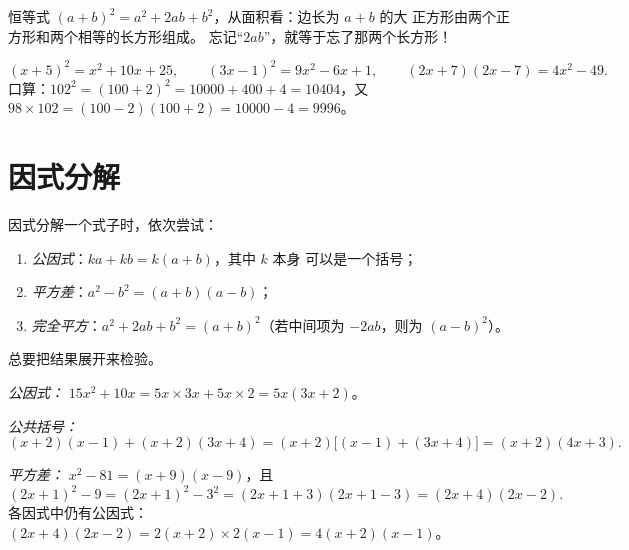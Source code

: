 \begin{omfigure}

{\small 恒等式 $(a+b)^2 = a^2 + 2ab + b^2$，从面积看：边长为 $a+b$ 的大
正方形由两个正方形和两个相等的长方形组成。
忘记“$2ab$”，就等于忘了那两个长方形！}
\end{omfigure}

\begin{example}\label{ex:g9:algebra:identities}
\[
(x + 5)^2 = x^2 + 10x + 25, \qquad
(3x - 1)^2 = 9x^2 - 6x + 1, \qquad
(2x + 7)(2x - 7) = 4x^2 - 49 .
\]
口算：$102^2 = (100 + 2)^2 = 10000 + 400 + 4 = 10404$，又
$98 \times 102 = (100-2)(100+2) = 10000 - 4 = 9996$。
\end{example}

\section{因式分解}

\begin{method}[因式分解]\label{met:g9:algebra:factor}
因式分解一个式子时，依次尝试：
\begin{enumerate}
  \item \emph{公因式}：$ka + kb = k(a + b)$，其中 $k$ 本身
        可以是一个括号；
  \item \emph{平方差}：$a^2 - b^2 = (a+b)(a-b)$；
  \item \emph{完全平方}：$a^2 + 2ab + b^2 = (a+b)^2$（若中间项为
        $-2ab$，则为 $(a-b)^2$）。
\end{enumerate}
总要把结果展开来检验。
\end{method}

\begin{example}\label{ex:g9:algebra:factor}
\emph{公因式：}
$15x^2 + 10x = 5x \times 3x + 5x \times 2 = 5x(3x + 2)$。

\emph{公共括号：}
\[
(x+2)(x-1) + (x+2)(3x+4) = (x+2)\bigl[(x-1) + (3x+4)\bigr]
= (x+2)(4x+3).
\]

\emph{平方差：}
$x^2 - 81 = (x+9)(x-9)$，且
\[
(2x+1)^2 - 9 = (2x+1)^2 - 3^2 = (2x+1+3)(2x+1-3) = (2x+4)(2x-2).
\]
各因式中仍有公因式：$(2x+4)(2x-2) = 2(x+2) \times
2(x-1) = 4(x+2)(x-1)$。
\end{example}

